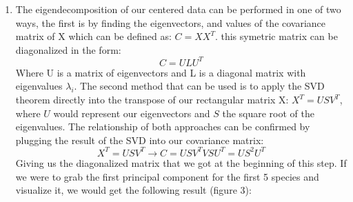 \documentclass[11pt]{article}
\begin{document}
\begin{singlespace}
\begin{enumerate}
\item The eigendecomposition of our centered data can be performed in one of two ways, the first is by finding the eigenvectors, and values of the covariance matrix of X which can be defined as: $ C = XX^T $. this symetric matrix can be diagonalized in the form: 
$$ C = ULU^T$$ 
Where U is a matrix of eigenvectors and L is a diagonal matrix with eigenvalues $\lambda_i$. The second method that can be used is to apply the SVD theorem directly into the transpose of our rectangular matrix X: $X^T = USV^T$, where $U$ would represent our eigenvectors and $S$ the square root of the eigenvalues. The relationship of both approaches can be confirmed by plugging the result of the SVD into our covariance matrix:
$$ X^T = USV^T  \rightarrow C = USV^TVSU^T = US^2U^T$$
Giving us the diagonalized matrix that we got at the beginning of this step. If we were to grab the first principal component for the first 5 species and visualize it, we would get the following result (figure 3):

\begin{figure}[h]
    \centering
    

\end{figure}
\end{enumerate}
\end{singlespace}
\end{document}
